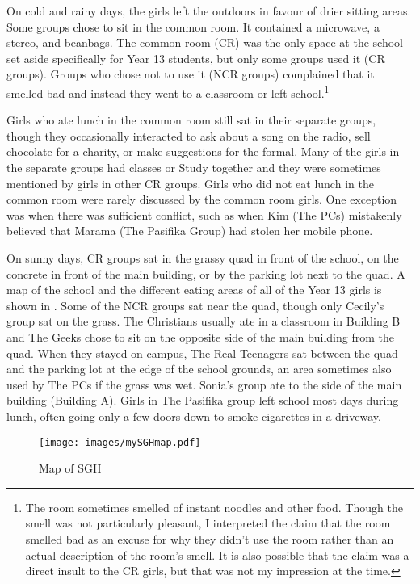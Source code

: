On cold and rainy days, the girls left the outdoors in favour of drier sitting areas. Some groups chose to sit in the common room. It contained a microwave, a stereo, and beanbags. The common room (CR) was the only space at the school set aside specifically for Year 13 students, but only some groups used it (CR groups). Groups who chose not to use it (NCR groups) complained that it smelled bad and instead they went to a classroom or left school.\footnote{The room sometimes smelled of instant noodles and other food. Though the smell was not particularly pleasant, I interpreted the claim that the room smelled bad as an excuse for why they didn't use the room rather than an actual description of the room's smell. It is also possible that the claim was a direct insult to the CR girls, but that was not my impression at the time.} 

Girls who ate lunch in the common room still sat in their separate groups, though they occasionally interacted to ask about a song on the radio, sell chocolate for a charity, or make suggestions for the formal. Many of the girls in the separate groups had classes or Study together and they were sometimes mentioned by girls in other CR groups. Girls who did not eat lunch in the common room were rarely discussed by the common room girls. One exception was when there was sufficient conflict, such as when Kim (The PCs) mistakenly believed that Marama (The Pasifika Group) had stolen her mobile phone. 




On sunny days, CR groups sat in the grassy quad in front of the school, on the concrete in front of the main building, or by the parking lot next to the quad. A map of the school and the different eating areas of all of the Year 13 girls is shown in . Some of the NCR groups sat near the quad, though only Cecily's group sat on the grass. The Christians usually ate in a classroom in Building B and The Geeks chose to sit on the opposite side of the main building from the quad. When they stayed on campus, The Real Teenagers sat between the quad and the parking lot at the edge of the school grounds, an area sometimes also used by The PCs if the grass was wet. Sonia's group ate to the side of the main building (Building A). Girls in The Pasifika group left school most days during lunch, often going only a few doors down to smoke cigarettes in a driveway. 

\begin{figure}[p]
	\centering
		\texttt{[image: images/mySGHmap.pdf]}
	\caption{Map of SGH}
	\label{fig:mySGHmap}
\end{figure}



